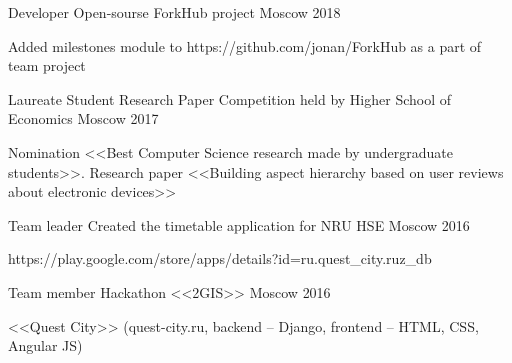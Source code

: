 


\begin{cventries}
	
\cventry
{Developer} %
{Open-sourse ForkHub project} %
{Moscow} %
{2018} %
{ %
	\begin{cvitems}
		\item {Added milestones module to https://github.com/jonan/ForkHub as a part of team project}
	\end{cvitems}
}	
	

\cventry
{Laureate} %
{Student Research Paper Competition held by Higher School of Economics} %
{Moscow} %
{2017} %
{ %
	\begin{cvitems}
		\item {Nomination <<Best Computer Science research made by undergraduate students>>. Research paper <<Building aspect hierarchy based on user reviews about electronic devices>>}
	\end{cvitems}
}


\cventry
{Team leader} %
{Created the timetable application for NRU HSE} %
{Moscow} %
{2016} %
{ %
	\begin{cvitems}
		\item {https://play.google.com/store/apps/details?id=ru.quest\_city.ruz\_db}
	\end{cvitems}
}



\cventry
{Team member} %
{Hackathon <<2GIS>>} %
{Moscow} %
{2016} %
{ %
\begin{cvitems}
\item {<<Quest City>> (quest-city.ru, backend – Django, frontend – HTML, CSS, Angular JS)}
\end{cvitems}
}


\end{cventries}
